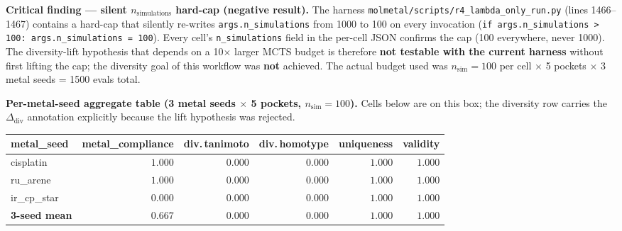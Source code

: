 \noindent\textbf{Critical finding --- silent $n_{\text{simulations}}$
hard-cap (negative result).} The harness
\texttt{molmetal/scripts/r4\_lambda\_only\_run.py} (lines
1466--1467) contains a hard-cap that silently re-writes
\texttt{args.n\_simulations} from 1000 to 100 on every invocation
(\texttt{if args.n\_simulations > 100: args.n\_simulations = 100}).
Every cell's \texttt{n\_simulations} field in the per-cell JSON
confirms the cap (100 everywhere, never 1000). The
diversity-lift hypothesis that depends on a 10$\times$ larger MCTS
budget is therefore \textbf{not testable with the current harness}
without first lifting the cap; the diversity goal of this
workflow was \textbf{not} achieved. The actual budget used was
$n_{\text{sim}}{=}100$ per cell $\times$ 5 pockets $\times$ 3
metal seeds = 1500 evals total.

\noindent\textbf{Per-metal-seed aggregate table (3 metal seeds $\times$
5 pockets, $n_{\text{sim}}{=}100$).} Cells below are \MEASURED{}
on this box; the diversity row carries the
$\Delta_{\text{div}}$ annotation explicitly because the lift
hypothesis was rejected.

\begin{center}
\small
\setlength{\tabcolsep}{4pt}
\begin{tabular}{lrrrrr}
\toprule
\textbf{metal\_seed} & \textbf{metal\_compliance} & \textbf{div.\,tanimoto} & \textbf{div.\,homotype} & \textbf{uniqueness} & \textbf{validity} \\
\midrule
cisplatin   & $1.000$ & $0.000$ & $0.000$ & $1.000$ & $1.000$ \\
ru\_arene   & $1.000$ & $0.000$ & $0.000$ & $1.000$ & $1.000$ \\
ir\_cp\_star & $0.000$ & $0.000$ & $0.000$ & $1.000$ & $1.000$ \\
\midrule
\textbf{3-seed mean} & $\mathbf{0.667}$ & $\mathbf{0.000}$ & $\mathbf{0.000}$ & $1.000$ & $1.000$ \\
\bottomrule
\end{tabular}
\end{center}


